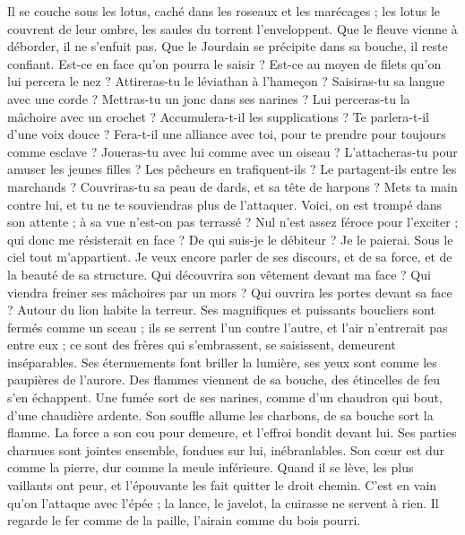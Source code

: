 \begin{multicols}{2}
Il se couche sous les lotus, caché dans les roseaux et les marécages ;
les lotus le couvrent de leur ombre, les saules du torrent l'enveloppent.
Que le fleuve vienne à déborder, il ne s'enfuit pas. Que le Jourdain se précipite dans sa bouche, il reste confiant.
Est-ce en face qu'on pourra le saisir ? Est-ce au moyen de filets qu'on lui percera le nez ?
Attireras-tu le léviathan à l'hameçon ? Saisiras-tu sa langue avec une corde ?
Mettras-tu un jonc dans ses narines ? Lui perceras-tu la mâchoire avec un crochet ?
Accumulera-t-il les supplications ? Te parlera-t-il d'une voix douce ?
Fera-t-il une alliance avec toi, pour te prendre pour toujours comme esclave ?
Joueras-tu avec lui comme avec un oiseau ? L'attacheras-tu pour amuser les jeunes filles ?
Les pêcheurs en trafiquent-ils ? Le partagent-ils entre les marchands ?
Couvriras-tu sa peau de dards, et sa tête de harpons ?
Mets ta main contre lui, et tu ne te souviendras plus de l'attaquer.
Voici, on est trompé dans son attente ; à sa vue n'est-on pas terrassé ?
\VerseOne{}Nul n'est assez féroce pour l'exciter ; qui donc me résisterait en face ?
De qui suis-je le débiteur ? Je le paierai. Sous le ciel tout m'appartient.
Je veux encore parler de ses discours, et de sa force, et de la beauté de sa structure.
Qui découvrira son vêtement devant ma face ? Qui viendra freiner ses mâchoires par un mors ?
Qui ouvrira les portes devant sa face ? Autour du lion habite la terreur.
Ses magnifiques et puissants boucliers sont fermés comme un sceau ;
ils se serrent l'un contre l'autre, et l'air n'entrerait pas entre eux ;
ce sont des frères qui s'embrassent, se saisissent, demeurent inséparables.
Ses éternuements font briller la lumière, ses yeux sont comme les paupières de l'aurore.
Des flammes viennent de sa bouche, des étincelles de feu s'en échappent.
Une fumée sort de ses narines, comme d'un chaudron qui bout, d'une chaudière ardente.
Son souffle allume les charbons, de sa bouche sort la flamme.
La force a son cou pour demeure, et l'effroi bondit devant lui.
Ses parties charnues sont jointes ensemble, fondues sur lui, inébranlables.
Son cœur est dur comme la pierre, dur comme la meule inférieure.
Quand il se lève, les plus vaillants ont peur, et l'épouvante les fait quitter le droit chemin.
C'est en vain qu'on l’attaque avec l'épée ; la lance, le javelot, la cuirasse ne servent à rien.
Il regarde le fer comme de la paille, l'airain comme du bois pourri.

\end{multicols}
